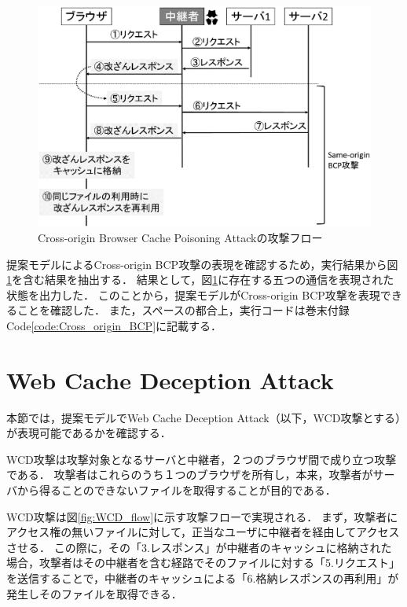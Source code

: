 \documentclass[12pt,a4paper]{jbook}
\begin{document}
\begin{figure}[htb]
\centering
\includegraphics[width=450pt]{./fig/CrossBCP_flow.eps}
\caption{Cross-origin Browser Cache Poisoning Attackの攻撃フロー}
\label{fig:CrossBCP_flow}
\end{figure}

提案モデルによるCross-origin BCP攻撃の表現を確認するため，実行結果から図\ref{fig:CrossBCP_flow}を含む結果を抽出する．
結果として，図\ref{fig:CrossBCP_flow}に存在する五つの通信を表現された状態を出力した．
このことから，提案モデルがCross-origin BCP攻撃を表現できることを確認した．
また，スペースの都合上，実行コードは巻末付録Code\ref{code:Cross_origin_BCP}に記載する．

\section{Web Cache Deception Attack}
本節では，提案モデルでWeb Cache Deception Attack\cite{WCD}（以下，WCD攻撃とする）が表現可能であるかを確認する．

WCD攻撃は攻撃対象となるサーバと中継者，２つのブラウザ間で成り立つ攻撃である．
攻撃者はこれらのうち１つのブラウザを所有し，本来，攻撃者がサーバから得ることのできないファイルを取得することが目的である．

WCD攻撃は図\ref{fig:WCD_flow}に示す攻撃フローで実現される．
まず，攻撃者にアクセス権の無いファイルに対して，正当なユーザに中継者を経由してアクセスさせる．
この際に，その「3.レスポンス」が中継者のキャッシュに格納された場合，攻撃者はその中継者を含む経路でそのファイルに対する「5.リクエスト」を送信することで，中継者のキャッシュによる「6.格納レスポンスの再利用」が発生しそのファイルを取得できる．
\end{document}
